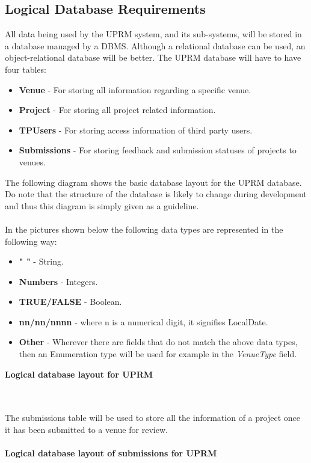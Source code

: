	\newpage	
	\subsection{Logical Database Requirements}
		All data being used by the UPRM system, and its sub-systems, will be stored in a database managed by a DBMS. Although a relational database can be used, an object-relational database will be better. The UPRM database will have to have four tables:
		\begin{itemize}
			\item \textbf{Venue} - For storing all information regarding a specific venue.
			\item \textbf{Project} - For storing all project related information.
			\item \textbf{TPUsers} - For storing access information of third party users.
			\item \textbf{Submissions} - For storing feedback and submission statuses of projects to venues.
		\end{itemize}
		The following diagram shows the basic database layout for the UPRM database. Do note that the structure of the database is likely to change during development and thus this diagram is simply given as a guideline.\\ \\
		In the pictures shown below the following data types are represented in the following way:
		\begin{itemize}
			\item \textbf{" "} - String.
			\item \textbf{Numbers} - Integers.
			\item \textbf{TRUE/FALSE} - Boolean.
			\item \textbf{nn/nn/nnnn} - where n is a numerical digit, it signifies LocalDate.
			\item \textbf{Other} - Wherever there are fields that do not match the above data types, then an Enumeration type will be used for example in the \emph{VenueType} field.\\
		\end{itemize}
		
		\textbf{Logical database layout for UPRM}\\
		\centerline{} \\ \\
		The submissions table will be used to store all the information of a project once it has been submitted to a venue for review.\\ \\
		\textbf{Logical database layout of submissions for UPRM}\\
		\centerline{} \\ \\
		

